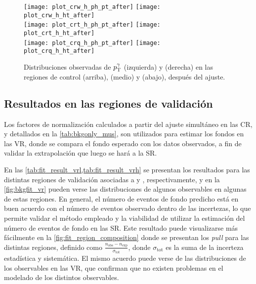 \begin{figure}[!htb]
  \centering

  \texttt{[image: plot\_crw\_h\_ph\_pt\_after]} \hspace{1cm}
  \texttt{[image: plot\_crw\_h\_ht\_after]} \\

  \texttt{[image: plot\_crt\_h\_ph\_pt\_after]} \hspace{1cm}
  \texttt{[image: plot\_crt\_h\_ht\_after]} \\

  \texttt{[image: plot\_crq\_h\_ph\_pt\_after]} \hspace{1cm}
  \texttt{[image: plot\_crq\_h\_ht\_after]} \\

  \caption{Distribuciones observadas de $p_{\mathrm{T}}^\gamma$ (izquierda) y {\HT} (derecha) en las
    regiones de control {\CRWH} (arriba), {\CRTH} (medio) y {\CRQH} (abajo),
    después del ajuste.}
  \label{fig:bkgfit_crh_after}

\end{figure}





\subsection{Resultados en las regiones de validación}

Los factores de normalización calculados a partir del ajuste simultáneo en las
CR, y detallados en la \cref{tab:bkgonly_mus}, son utilizados para estimar los
fondos en las VR, donde se compara el fondo esperado con los datos observados, a
fin de validar la extrapolación que luego se hará a la SR.

En las \cref{tab:fit_result_vrl,tab:fit_result_vrh} se presentan los resultados
para las distintas regiones de validación asociadas a {\SRL} y {\SRH},
respectivamente, y en la \cref{fig:bkgfit_vr} pueden verse las distribuciones
de algunos observables en algunas de estas regiones. En general, el número de
eventos de fondo predicho está en buen acuerdo con el número de eventos
observado dentro de las incertezas, lo que permite validar el método empleado y
la viabilidad de utilizar la estimación del número de eventos de fondo en las
SR. Este resultado puede visualizarse más fácilmente en la
\cref{fig:fit_region_composition} donde se presentan los \emph{pull} para las
distintas regiones, definido como $\frac{n_\text{obs} - n_\text{exp}}{\sigma_\text{tot}}$,
donde $\sigma_\text{tot}$ es la suma de la incerteza estadística y sistemática.
El mismo acuerdo puede verse de las distribuciones de los
observables en las VR, que confirman que no existen problemas en el
modelado de los distintos observables.

